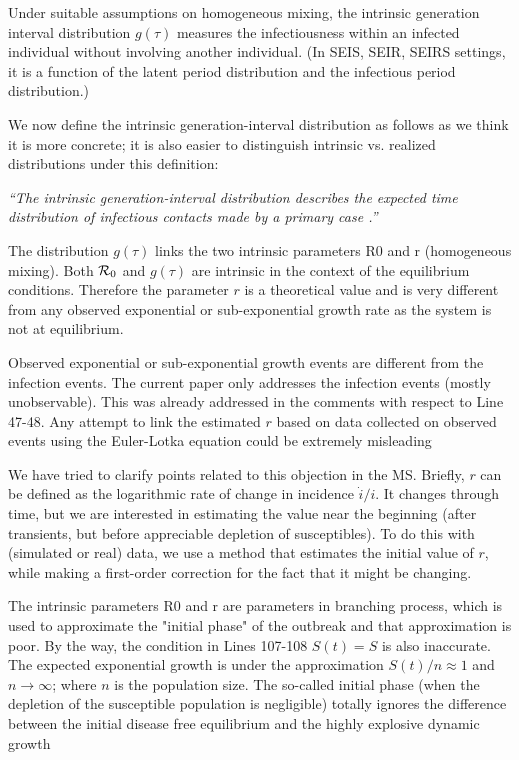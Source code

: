 \documentclass[12pt]{article}
\newcommand{\Rx}[1]{\ensuremath{{\cal R}_{#1}}}
\newcommand{\Ro}{\Rx{0}}
\newcommand{\revtext}{\textsf}
\newcommand{\newtext}[1]{\textsl{``#1''}}
\begin{document}
\revtext{Under suitable assumptions on homogeneous mixing, the intrinsic
generation interval distribution $g(\tau)$ measures the infectiousness within
an infected individual without involving another individual. (In SEIS,
SEIR, SEIRS settings, it is a function of the latent period distribution
and the infectious period distribution.)}

We now define the intrinsic generation-interval distribution as follows as we think it is more concrete; it is also easier to distinguish intrinsic vs. realized distributions under this definition:

\newtext{The \emph{intrinsic} generation-interval distribution describes the expected time distribution of infectious contacts made by a primary case \citep{champredon2015intrinsic}.}

\revtext{The distribution $g(\tau)$ links the two intrinsic parameters R0 and r
(homogeneous mixing). Both $\Ro$ and $g(\tau)$ are intrinsic in the context of the equilibrium conditions. Therefore the parameter $r$ is a theoretical value and is very different from any observed exponential
or sub-exponential growth rate as the system is not at equilibrium.}

\revtext{Observed exponential or sub-exponential growth events are different from the infection events. The current paper only addresses the infection events (mostly unobservable). This was
already addressed in the comments with respect to Line 47-48.
Any attempt to link the estimated $r$ based on data collected
on observed events using the Euler-Lotka equation could be extremely misleading}

We have tried to clarify points related to this objection in the MS. 
Briefly, $r$ can be defined as the logarithmic rate of change in incidence $\dot i/i$. It changes through time, but we are interested in estimating the value near the beginning (after transients, but before appreciable depletion of susceptibles). To do this with (simulated or real) data, we use a method that estimates the initial value of $r$, while making a first-order correction for the fact that it might be changing.

\revtext{
The intrinsic parameters R0 and r are parameters in branching
process, which is used to approximate the "initial phase" of the
outbreak and that approximation is poor. By the way, the condition in Lines 107-108 $S(t) = S$ is also inaccurate. The expected exponential growth is under the approximation $S(t)/n \approx 1$ and
$n \to \infty$; where $n$ is the population size. The so-called initial
phase (when the depletion of the susceptible population is negligible) totally ignores the difference between the initial disease free equilibrium and the highly explosive dynamic growth
}
\end{document}
